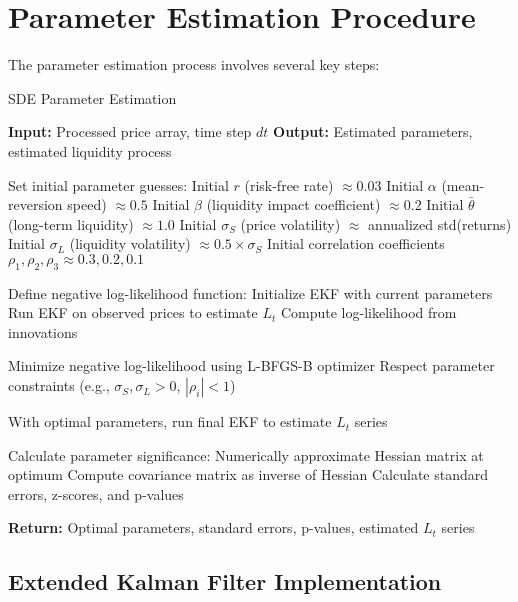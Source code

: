 \documentclass[12pt,a4paper]{article}
\begin{document}
\section{Parameter Estimation Procedure}

The parameter estimation process involves several key steps:

\begin{algorithm}
\caption{SDE Parameter Estimation}
\begin{algorithmic}[1]
\State \textbf{Input:} Processed price array, time step $dt$
\State \textbf{Output:} Estimated parameters, estimated liquidity process

\State Set initial parameter guesses:
\State \quad Initial $r$ (risk-free rate) $\approx 0.03$
\State \quad Initial $\alpha$ (mean-reversion speed) $\approx 0.5$
\State \quad Initial $\beta$ (liquidity impact coefficient) $\approx 0.2$
\State \quad Initial $\bar{\theta}$ (long-term liquidity) $\approx 1.0$
\State \quad Initial $\sigma_S$ (price volatility) $\approx$ annualized std(returns)
\State \quad Initial $\sigma_L$ (liquidity volatility) $\approx 0.5 \times \sigma_S$
\State \quad Initial correlation coefficients $\rho_1, \rho_2, \rho_3 \approx 0.3, 0.2, 0.1$

\State Define negative log-likelihood function:
\State \quad Initialize EKF with current parameters
\State \quad Run EKF on observed prices to estimate $L_t$
\State \quad Compute log-likelihood from innovations

\State Minimize negative log-likelihood using L-BFGS-B optimizer
\State \quad Respect parameter constraints (e.g., $\sigma_S, \sigma_L > 0$, $|\rho_i| < 1$)

\State With optimal parameters, run final EKF to estimate $L_t$ series

\State Calculate parameter significance:
\State \quad Numerically approximate Hessian matrix at optimum
\State \quad Compute covariance matrix as inverse of Hessian
\State \quad Calculate standard errors, z-scores, and p-values

\State \textbf{Return:} Optimal parameters, standard errors, p-values, estimated $L_t$ series
\end{algorithmic}
\end{algorithm}

\subsection{Extended Kalman Filter Implementation}
\end{document}
